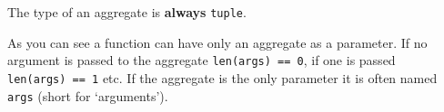\begin{frame}[fragile]

\begin{Shaded}
\begin{Highlighting}[]
 \OperatorTok{*}\OperatorTok{=}\NormalTok{):}
\NormalTok{,}\NormalTok{,}\NormalTok{,}\NormalTok{)  }
\NormalTok{,}\NormalTok{,}\NormalTok{,}\NormalTok{,}\NormalTok{,}\NormalTok{,}\NormalTok{,}\NormalTok{,}\NormalTok{)  }
\OperatorTok{=}\NormalTok{)  }
\OperatorTok{=}\NormalTok{)  }
\OperatorTok{=}\OperatorTok{=}\NormalTok{)  }
\end{Highlighting}
\end{Shaded}

The type of an aggregate is \textbf{always} \texttt{tuple}.

\end{frame}

\begin{frame}[fragile]

\begin{Shaded}
\begin{Highlighting}[]
 \OperatorTok{*}
    \NormalTok{(}
\end{Highlighting}
\end{Shaded}

As you can see a function can have only an aggregate as a parameter. If
no argument is passed to the aggregate \texttt{len(args)\ ==\ 0}, if one
is passed \texttt{len(args)\ ==\ 1} etc. If the aggregate is the only
parameter it is often named \texttt{args} (short for `arguments').

\end{frame}

